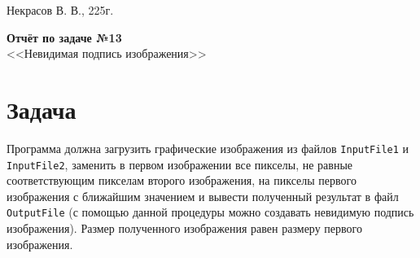\documentclass[12pt,a4paper]{scrartcl}
\begin{document}
\begin{flushright}
    Некрасов В. В., 225г.
\end{flushright}
\begin{center}
    \Large \textbf{Отчёт по задаче №13}\\
    <<Невидимая подпись изображения>>
\end{center}

\section{Задача} 
Программа должна загрузить графические изображения из файлов \texttt{InputFile1} и \texttt{InputFile2}, заменить в первом изображении все пикселы, не равные соответствующим пикселам второго изображения, на пикселы первого изображения с ближайшим значением и вывести полученный результат в файл \texttt{OutputFile} (с помощью данной процедуры можно создавать невидимую подпись изображения). Размер полученного изображения равен размеру первого изображения. 
\end{document}
